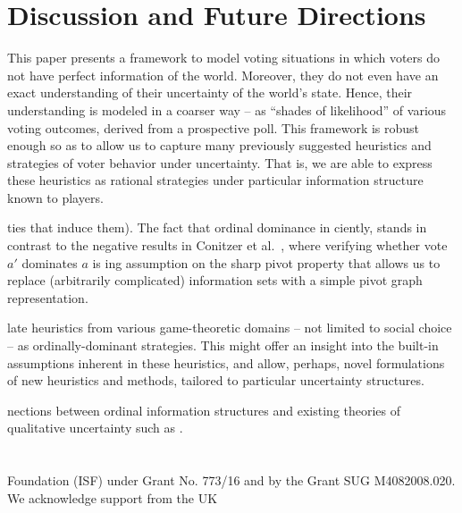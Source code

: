 \documentclass[letterpaper]{article} %
\begin{document}
\section{Discussion and Future Directions}

This paper presents a framework to model voting situations in which voters do not have perfect information of the world. Moreover, they do not even have an exact understanding of their uncertainty of the world's state. Hence, their understanding is modeled in a coarser way -- as ``shades of likelihood'' of various voting outcomes, derived from a prospective poll. This framework is robust enough so as to allow us to capture many previously suggested heuristics and strategies of voter behavior under uncertainty. That is, we are able to express these heuristics as rational strategies under particular information structure known to players.

   ties that induce them).
 The fact that ordinal dominance in ciently, stands in contrast to the negative results in Conitzer et al.~, where verifying whether vote $a'$ dominates $a$ is ing assumption on the sharp pivot property that allows us to replace (arbitrarily complicated) information sets with a simple pivot graph representation.

late heuristics from various game-theoretic domains -- not limited to social choice -- as ordinally-dominant strategies. This might offer an insight into the built-in assumptions inherent in these heuristics, and allow, perhaps, novel formulations of new heuristics and methods, tailored to particular uncertainty structures.

nections between ordinal information structures and existing theories of qualitative uncertainty such as \cite{Hal97}.

\section{}

 Foundation (ISF) under Grant No. 773/16 and by the Grant SUG  M4082008.020. We acknowledge support from the UK  




\clearpage

\end{document}
